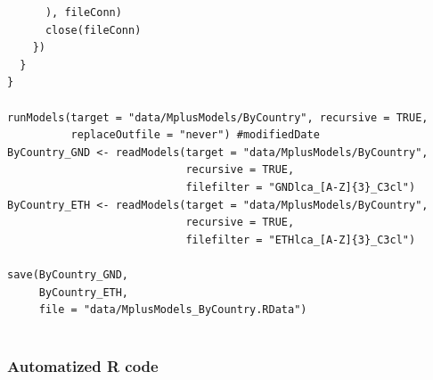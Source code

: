 \documentclass[12pt,a4paper,oneside]{reedthesis}
\begin{document}
\begin{verbatim}
      ), fileConn)
      close(fileConn)
    })
  }
}

runModels(target = "data/MplusModels/ByCountry", recursive = TRUE, 
          replaceOutfile = "never") #modifiedDate
ByCountry_GND <- readModels(target = "data/MplusModels/ByCountry", 
                            recursive = TRUE, 
                            filefilter = "GNDlca_[A-Z]{3}_C3cl")
ByCountry_ETH <- readModels(target = "data/MplusModels/ByCountry", 
                            recursive = TRUE, 
                            filefilter = "ETHlca_[A-Z]{3}_C3cl")

save(ByCountry_GND,
     ByCountry_ETH,
     file = "data/MplusModels_ByCountry.RData")
 
\end{verbatim}
\hypertarget{automatized-r-code}{%
\subsubsection{Automatized R code}\label{automatized-r-code}}
\end{document}
